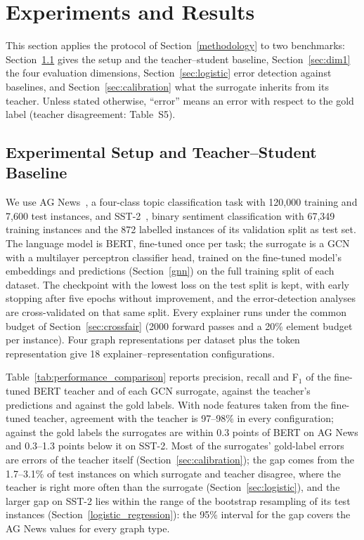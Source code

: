 
\section{Experiments and Results} \label{discussion}

This section applies the protocol of Section~\ref{methodology} to two benchmarks: Section~\ref{configuration} gives the setup and the teacher--student baseline, Section~\ref{sec:dim1} the four evaluation dimensions, Section~\ref{sec:logistic} error detection against baselines, and Section~\ref{sec:calibration} what the surrogate inherits from its teacher. Unless stated otherwise, ``error'' means an error with respect to the gold label (teacher disagreement: Table~S5).

\subsection{Experimental Setup and Teacher--Student Baseline} \label{configuration} \label{sec:llm_teacher}

We use AG News~\cite{10.5555/2969239.2969312}, a four-class topic classification task with 120,000 training and 7,600 test instances, and SST-2~\cite{socher-etal-2013-recursive}, binary sentiment classification with 67,349 training instances and the 872 labelled instances of its validation split as test set. The language model is BERT, fine-tuned once per task; the surrogate is a GCN with a multilayer perceptron classifier head, trained on the fine-tuned model's embeddings and predictions (Section~\ref{gnn}) on the full training split of each dataset. The checkpoint with the lowest loss on the test split is kept, with early stopping after five epochs without improvement, and the error-detection analyses are cross-validated on that same split. Every explainer runs under the common budget of Section~\ref{sec:crossfair} (2000 forward passes and a 20\% element budget per instance). Four graph representations per dataset plus the token representation give 18 explainer--representation configurations.



Table~\ref{tab:performance_comparison} reports precision, recall and F\(_1\) of the fine-tuned BERT teacher and of each GCN surrogate, against the teacher's predictions and against the gold labels. With node features taken from the fine-tuned teacher, agreement with the teacher is 97--98\% in every configuration; against the gold labels the surrogates are within 0.3 points of BERT on AG News and 0.3--1.3 points below it on SST-2. Most of the surrogates' gold-label errors are errors of the teacher itself (Section~\ref{sec:calibration}); the gap comes from the 1.7--3.1\% of test instances on which surrogate and teacher disagree, where the teacher is right more often than the surrogate (Section~\ref{sec:logistic}), and the larger gap on SST-2 lies within the range of the bootstrap resampling of its test instances (Section~\ref{logistic_regression}): the 95\% interval for the gap covers the AG News values for every graph type.

